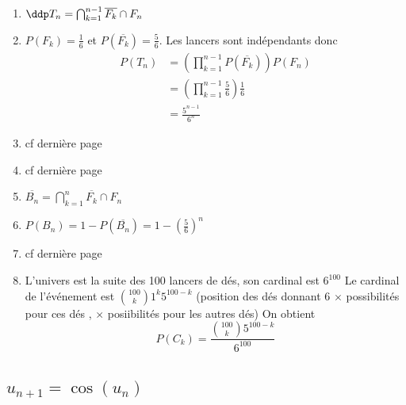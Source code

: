 \begin{correction}
\begin{enumerate}
\item $\ddp T_n = \bigcap_{k=1}^{n-1} \overline{F_k}  \cap F_n$
\item $P(F_k) = \frac{1}{6}$  et $P( \overline{F_k}) = \frac{5}{6}$. Les lancers sont indépendants donc 
\begin{align*}
P(T_n) &= \left(\prod_{k=1}^{n-1}  P( \overline{F_k} )\right) P (F_n)\\
&= \left(\prod_{k=1}^{n-1}  \frac{5}{6}\right) \frac{1}{6}\\
&= \frac{5^{n-1}}{6^n}
\end{align*}
\item cf dernière page
\item cf dernière page
\item $\overline{B_n} = \bigcap_{k=1}^{n} \overline{F_k}  \cap F_n$
\item $P(B_n) = 1- P(\overline{B_n} ) = 1- \left(\frac{5}{6}\right)^n$
\item cf dernière page
\item L'univers est la suite des 100 lancers de dés, son cardinal est $6^{100}$ 
Le cardinal de l'événement  est $\binom{100}{k}1^k 5^{100-k}$ (position des dés donnant 6 $\times$ possibilités pour 
 ces dés  , $\times $ posiibilités pour les autres dés)
 On obtient 
 $$P(C_k)  =\frac{\binom{100}{k} 5^{100-k}}{6^{100}}$$

\end{enumerate}
\end{correction}




\subsection{$u_{n+1} = \cos(u_n)$}

